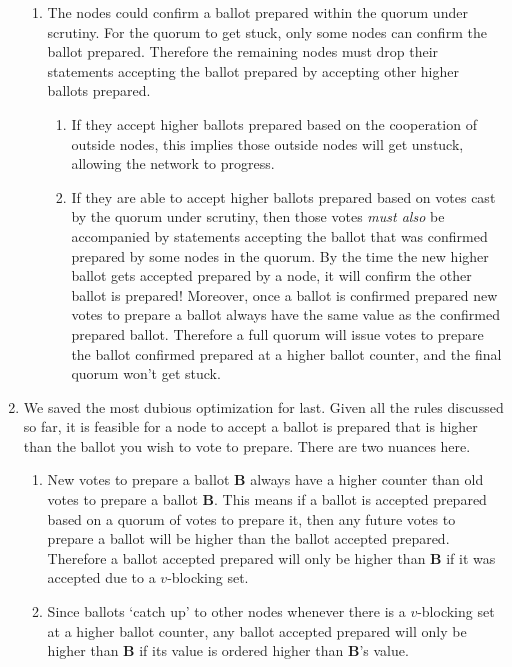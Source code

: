 \begin{enumerate}
\begin{enumerate}
        \item The nodes could confirm a ballot prepared within the quorum under scrutiny. For the quorum to get stuck, only some nodes can confirm the ballot prepared. Therefore the remaining nodes must drop their statements accepting the ballot prepared by accepting other higher ballots prepared.
        \begin{enumerate}
            \item If they accept higher ballots prepared based on the cooperation of outside nodes, this implies those outside nodes will get unstuck, allowing the network to progress.

            \item If they are able to accept higher ballots prepared based on votes cast by the quorum under scrutiny, then those votes {\em must also} be accompanied by statements accepting the ballot that was confirmed prepared by some nodes in the quorum. By the time the new higher ballot gets accepted prepared by a node, it will confirm the other ballot is prepared! Moreover, once a ballot is confirmed prepared new votes to prepare a ballot always have the same value as the confirmed prepared ballot. Therefore a full quorum will issue votes to prepare the ballot confirmed prepared at a higher ballot counter, and the final quorum won't get stuck.
        \end{enumerate}
    \end{enumerate}

    \item We saved the most dubious optimization for last. Given all the rules discussed so far, it is feasible for a node to accept a ballot is prepared that is higher than the ballot you wish to vote to prepare. There are two nuances here.
    \begin{enumerate}
        \item New votes to prepare a ballot \textbf{B} always have a higher counter than old votes to prepare a ballot \textbf{B}. This means if a ballot is accepted prepared based on a quorum of votes to prepare it, then any future votes to prepare a ballot will be higher than the ballot accepted prepared. Therefore a ballot accepted prepared will only be higher than \textbf{B} if it was accepted due to a $v$-blocking set.

        \item Since ballots `catch up' to other nodes whenever there is a $v$-blocking set at a higher ballot counter, any ballot accepted prepared will only be higher than \textbf{B} if its value is ordered higher than \textbf{B}'s value.
    \end{enumerate}


\end{enumerate}
